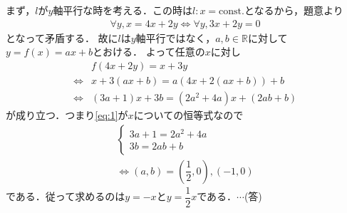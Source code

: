 \documentclass[../../main.tex]{subfiles}
\begin{document}
まず，$l$が$y$軸平行な時を考える．この時は$l:x=\text{const.}$となるから，題意より
\begin{align}
  \forall y,x=4x+2y\Longleftrightarrow \forall y,3x+2y=0
\end{align}
となって矛盾する．
故に$l$は$y$軸平行ではなく，$a,b\in\mathbb{R}$に対して$y=f(x)=ax+b$とおける．
よって任意の$x$に対し
\begin{align}
  &f(4x+2y)=x+3y \nonumber\\
  \Longleftrightarrow &x+3(ax+b)=a(4x+2(ax+b))+b \nonumber\\
  \Longleftrightarrow &(3a+1)x+3b=(2a^2+4a)x+(2ab+b) \label{eq:1}
\end{align}
が成り立つ．つまり\cref{eq:1}が$x$についての恒等式なので
\begin{align}
  \left\{
    \begin{array}{l}
      3a+1=2a^2+4a \\
      3b=2ab+b
    \end{array}
    \right.     \\
    \Longleftrightarrow
    (a,b)=\left(\dfrac{1}{2},0\right),(-1,0)
  \end{align}
  である．従って求めるのは$y=-x$と$y=\dfrac{1}{2}x$である．$\cdots$(答)
  \newpage
  
\end{document}
